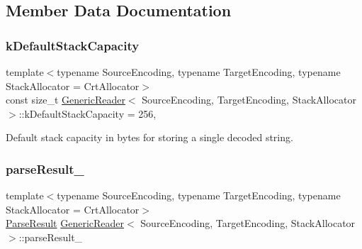\subsection{Member Data Documentation}
\mbox{\label{classGenericReader_ac507ea8672bf2b5d01b35583c0597f15}} 
\subsubsection{\texorpdfstring{k\+Default\+Stack\+Capacity}{kDefaultStackCapacity}}
{\footnotesize\ttfamily template$<$typename Source\+Encoding, typename Target\+Encoding, typename Stack\+Allocator = Crt\+Allocator$>$ \\
const size\+\_\+t \hyperlink{classGenericReader}{Generic\+Reader}$<$ Source\+Encoding, Target\+Encoding, Stack\+Allocator $>$\+::k\+Default\+Stack\+Capacity = 256\hspace{0.3cm}{\ttfamily [static]}, {\ttfamily [private]}}



Default stack capacity in bytes for storing a single decoded string. 

\mbox{\label{classGenericReader_a156018c2805bfa730287314ee9d9257d}} 
\subsubsection{\texorpdfstring{parse\+Result\+\_\+}{parseResult\_}}
{\footnotesize\ttfamily template$<$typename Source\+Encoding, typename Target\+Encoding, typename Stack\+Allocator = Crt\+Allocator$>$ \\
\hyperlink{structParseResult}{Parse\+Result} \hyperlink{classGenericReader}{Generic\+Reader}$<$ Source\+Encoding, Target\+Encoding, Stack\+Allocator $>$\+::parse\+Result\+\_\+\hspace{0.3cm}{\ttfamily [private]}}

\mbox{\label{classGenericReader_a7c04f4aa27561d358376920d06b78cdb}} 
